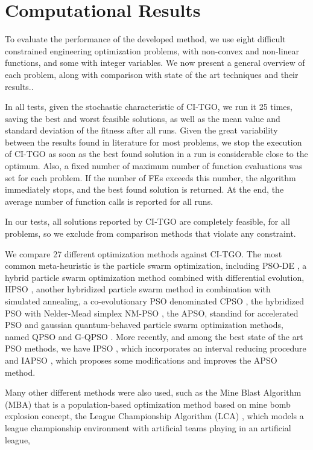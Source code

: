 \section{Computational Results} \label{sec:Results}

To evaluate the performance of the developed method, we use eight difficult constrained engineering optimization problems, with non-convex and non-linear functions, and some with integer variables. We now present a general overview of each problem, along with comparison with state of the art techniques and their results..

In all tests, given the stochastic characteristic of CI-TGO, we run it 25 times, saving the best and worst feasible solutions, as well as the mean value and standard deviation of the fitness after all runs. Given the great variability between the results found in literature for most problems, we stop the execution of CI-TGO as soon as the best found solution in a run is considerable close to the optimum. Also, a fixed number of maximum number of function evaluations was set for each problem. If the number of FEs exceeds this number, the algorithm immediately stops, and the best found solution is returned. At the end, the average number of function calls is reported for all runs.

In our tests, all solutions reported by CI-TGO are completely feasible, for all problems, so we exclude from comparison methods that violate any constraint.

We compare 27 different optimization methods against CI-TGO. The most common meta-heuristic is the particle swarm optimization, including PSO-DE \citep{PSO-DE}, a hybrid particle swarm optimization method combined with differential evolution, HPSO \citep{HPSO}, another hybridized particle swarm method in combination with simulated annealing, a co-evolutionary PSO denominated CPSO \citep{CPSO}, the hybridized PSO with Nelder-Mead simplex NM-PSO \cite{NM-PSO}, the APSO, standind for accelerated PSO  \citep{APSO} and gaussian quantum-behaved particle swarm optimization methods, named QPSO and G-QPSO \citep{QPSO}. More recently, and among the best state of the art PSO methods, we have IPSO \citep{IPSO}, which incorporates an interval reducing procedure and IAPSO \citep{IAPSO}, which proposes some modifications and improves the APSO method.

Many other different methods were also used, such as the Mine Blast Algorithm (MBA) \cite{MBA} that is a population-based optimization method based on mine bomb explosion concept, the League Championship Algorithm (LCA) \cite{LCA}, which models a league championship environment with artificial teams playing in an artificial league, 


